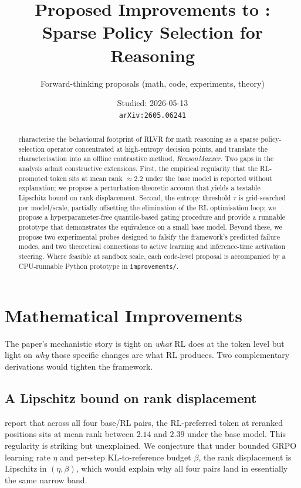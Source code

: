 \documentclass[11pt]{article}
\title{Proposed Improvements to \citet{akgul2026}: Sparse Policy Selection for Reasoning}
\author{Forward-thinking proposals (math, code, experiments, theory)}
\date{Studied: 2026-05-13 \\ \texttt{arXiv:2605.06241}}
\begin{document}
\maketitle

\begin{abstract}
\citet{akgul2026} characterise the behavioural footprint of RLVR for math reasoning as a sparse policy-selection operator concentrated at high-entropy decision points, and translate the characterisation into an offline contrastive method, \emph{ReasonMaxxer}. Two gaps in the analysis admit constructive extensions. First, the empirical regularity that the RL-promoted token sits at mean rank $\approx 2.2$ under the base model is reported without explanation; we propose a perturbation-theoretic account that yields a testable Lipschitz bound on rank displacement. Second, the entropy threshold $\tau$ is grid-searched per model/scale, partially offsetting the elimination of the RL optimisation loop; we propose a hyperparameter-free quantile-based gating procedure and provide a runnable prototype that demonstrates the equivalence on a small base model. Beyond these, we propose two experimental probes designed to falsify the framework's predicted failure modes, and two theoretical connections to active learning and inference-time activation steering. Where feasible at sandbox scale, each code-level proposal is accompanied by a CPU-runnable Python prototype in \texttt{improvements/}.
\end{abstract}

\section*{Mathematical Improvements}

The paper's mechanistic story is tight on \emph{what} RL does at the token level but light on \emph{why} those specific changes are what RL produces. Two complementary derivations would tighten the framework.

\subsection*{A Lipschitz bound on rank displacement}

\citet{akgul2026} report that across all four base/RL pairs, the RL-preferred token at reranked positions sits at mean rank between $2.14$ and $2.39$ under the base model. This regularity is striking but unexplained. We conjecture that under bounded GRPO learning rate $\eta$ and per-step KL-to-reference budget $\beta$, the rank displacement is Lipschitz in $(\eta, \beta)$, which would explain why all four pairs land in essentially the same narrow band.
\end{document}
